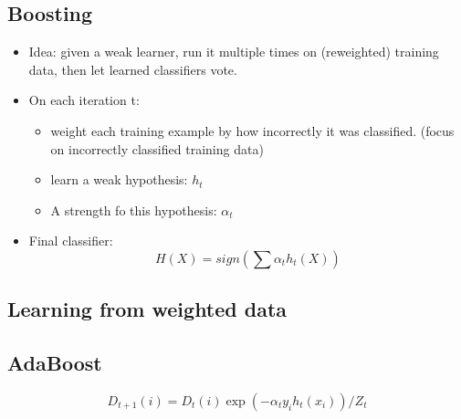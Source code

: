 \documentclass[letterpaper,10pt]{article}
\begin{document}
\subsection{Boosting}
\begin{itemize}
	\item Idea: given a weak learner, run it multiple times on (reweighted) training data, then let learned classifiers vote.
	\item On each iteration t:
	\begin{itemize}
		\item weight each training example by how incorrectly it was classified. (focus on incorrectly classified training data)
		\item learn a weak hypothesis: $h_t$
		\item A strength fo this hypothesis: $\alpha_t$
	\end{itemize}
	\item Final classifier:
	$$H(X)=sign(\sum \alpha_t h_t(X))$$
\end{itemize}

\subsection{Learning from weighted data}

\subsection{AdaBoost}

$$D_{t+1}(i)=D_t(i)\exp(-\alpha_t y_i h_t(x_i))/Z_t$$
\end{document}
